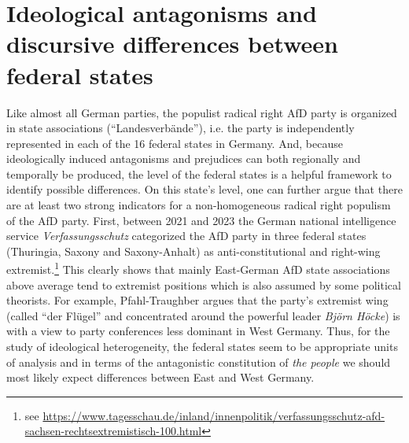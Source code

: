 \documentclass[a4paper]{scrreprt}
\begin{document}
\section{Ideological antagonisms and discursive differences between federal states}
Like almost all German parties, the populist radical right AfD party is organized in state associations (``Landesverbände''), i.e. the party is independently represented in each of the 16 federal states in Germany. And, because ideologically induced antagonisms and prejudices can both regionally and temporally be produced, the level of the federal states is a helpful framework to identify possible differences. On this state's level, one can further argue that there are at least two strong indicators for a non-homogeneous radical right populism of the AfD party. First, between 2021 and 2023 the German national intelligence service {\em Verfassungsschutz} categorized the AfD party in three federal states (Thuringia, Saxony and Saxony-Anhalt) as anti-constitutional and right-wing extremist.\footnote{see \url{https://www.tagesschau.de/inland/innenpolitik/verfassungsschutz-afd-sachsen-rechtsextremistisch-100.html}} This clearly shows that mainly East-German AfD state associations above average tend to extremist positions which is also assumed by some political theorists. For example, Pfahl-Traughber argues that the party's extremist wing (called ``der Flügel'' and concentrated around the powerful leader {\em Björn Höcke}) is with a view to party conferences less dominant in West Germany. \cite[p.~37]{pfahl:2019} Thus, for the study of ideological heterogeneity, the federal states seem to be appropriate units of analysis and in terms of the antagonistic constitution of {\em the people} we should most likely expect differences between East and West Germany.\par
\end{document}

